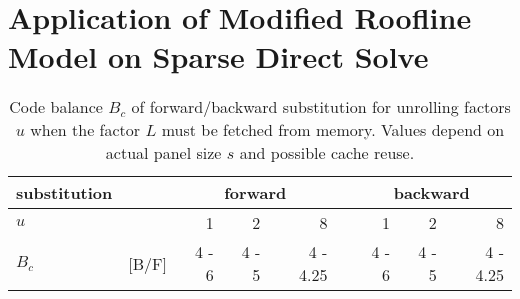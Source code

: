 \chapter{Application of Modified Roofline Model on Sparse Direct Solve}
\label{sec:mrm}

\begin{table}[!b]
  \centering
  \caption{Code balance $B_c$ of forward/backward substitution for
unrolling factors $u$ when
the factor $L$ must be fetched from memory.
Values depend on actual panel size $s$ and possible cache reuse.}
  \label{tab:mrm:bc}
  \begin{tabular}{ll|rrrc|rrr}
  \hline
  substitution && \multicolumn{3}{c}{forward}  && \multicolumn{3}{c}{backward} \\
  \cline{3-5} \cline{7-9}
  \hline
  $u$    &     &  1       & 2     & 8        & & 1       & 2     & 8  \\
  $B_c$  &[B/F]& 4 - 6    & 4 - 5 & 4 - 4.25 & & 4  - 6  & 4 - 5 & 4 - 4.25 \\
  \hline
  \end{tabular}
\end{table}

